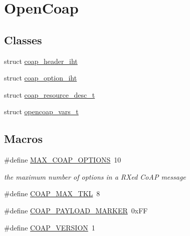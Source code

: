 \hypertarget{group__open_coap}{}\section{Open\+Coap}
\label{group__open_coap}
\subsection*{Classes}
\begin{DoxyCompactItemize}
\item 
struct \hyperlink{structcoap__header__iht}{coap\+\_\+header\+\_\+iht}
\item 
struct \hyperlink{structcoap__option__iht}{coap\+\_\+option\+\_\+iht}
\item 
struct \hyperlink{structcoap__resource__desc__t}{coap\+\_\+resource\+\_\+desc\+\_\+t}
\item 
struct \hyperlink{structopencoap__vars__t}{opencoap\+\_\+vars\+\_\+t}
\end{DoxyCompactItemize}
\subsection*{Macros}
\begin{DoxyCompactItemize}
\item 
\#define \hyperlink{group__open_coap_ga3155afe0b07d32f0fb33faabc0ea0ec6}{M\+A\+X\+\_\+\+C\+O\+A\+P\+\_\+\+O\+P\+T\+I\+O\+NS}~10
\begin{DoxyCompactList}\small\item\em the maximum number of options in a RX\textquotesingle{}ed Co\+AP message \end{DoxyCompactList}\item 
\#define \hyperlink{group__open_coap_gac74ba1d96b0defa127ca13247884a8d4}{C\+O\+A\+P\+\_\+\+M\+A\+X\+\_\+\+T\+KL}~8
\item 
\#define \hyperlink{group__open_coap_gab4e38910080deed0a5df4aec116d3999}{C\+O\+A\+P\+\_\+\+P\+A\+Y\+L\+O\+A\+D\+\_\+\+M\+A\+R\+K\+ER}~0x\+FF
\item 
\#define \hyperlink{group__open_coap_ga0cc059ba01b6be3d8abe18cc96ab2221}{C\+O\+A\+P\+\_\+\+V\+E\+R\+S\+I\+ON}~1
\end{DoxyCompactItemize}
